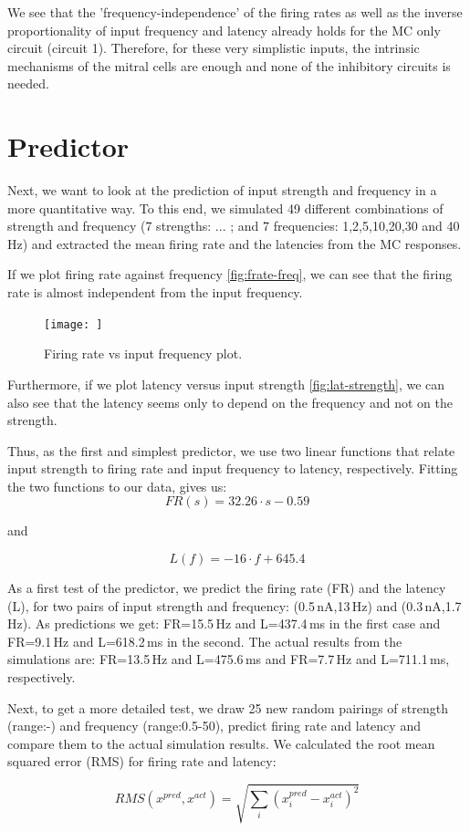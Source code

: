 \documentclass[11pt]{report}
\begin{document}
We see that the 'frequency-independence' of the firing rates as well as the inverse proportionality of input frequency and latency already holds for the MC only circuit (circuit 1). Therefore,
for these very simplistic inputs, the intrinsic mechanisms of the mitral cells are enough and none of the inhibitory circuits is needed.

\section*{Predictor}
Next, we want to look at the prediction of input strength and frequency in a more quantitative way. To this end, we simulated 49 different combinations of
strength and frequency (7 strengths: ... ; and 7 frequencies: 1,2,5,10,20,30 and 40\,Hz) and extracted the mean firing rate and the latencies from the MC responses.

If we plot firing rate against frequency \ref{fig:frate-freq}, we can see that the firing rate is almost independent from the input frequency.

\begin{figure}[!ht]
\centering
\texttt{[image: ]}
\caption{Firing rate vs input frequency plot.}
\label{fig;frate-freq}
\end{figure}

Furthermore, if we plot latency versus input strength \ref{fig:lat-strength}, we can also see that the latency seems only to depend on the frequency and not on the strength.

Thus, as the first and simplest predictor, we use two linear functions that relate input strength to firing rate and input frequency to latency, respectively. Fitting the two functions to our data,
gives us:
\[
 FR(s) = 32.26\cdot s - 0.59
\]

and 

\[
 L(f) = -16\cdot f + 645.4
\]

As a first test of the predictor, we predict the firing rate (FR) and the latency (L), for two pairs of input strength and frequency: (0.5\,nA,13\,Hz) and (0.3\,nA,1.7\,Hz).
As predictions we get: FR=15.5\,Hz and L=437.4\,ms in the first case and  FR=9.1\,Hz and L=618.2\,ms in the second.
The actual results from the simulations are: FR=13.5\,Hz and L=475.6\,ms and FR=7.7\,Hz and L=711.1\,ms, respectively.

Next, to get a more detailed test, we draw 25 new random pairings of strength (range:-) and frequency (range:0.5-50), predict firing rate and latency and compare them to the actual simulation results.
We calculated the root mean squared error (RMS) for firing rate and latency:

\[
 RMS(x^{pred},x^{act})=\sqrt { \sum_i (x^{pred}_i - x^{act}_i)^2}
\]
\end{document}
